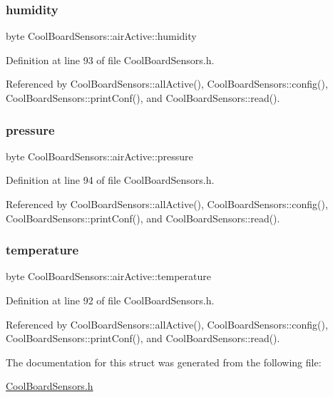 \subsubsection{\texorpdfstring{humidity}{humidity}}
{\footnotesize\ttfamily byte Cool\+Board\+Sensors\+::air\+Active\+::humidity}



Definition at line 93 of file Cool\+Board\+Sensors.\+h.



Referenced by Cool\+Board\+Sensors\+::all\+Active(), Cool\+Board\+Sensors\+::config(), Cool\+Board\+Sensors\+::print\+Conf(), and Cool\+Board\+Sensors\+::read().

\mbox{\label{structCoolBoardSensors_1_1airActive_ab200826a70d1dc9945f5efb6b9c732ed}} 
\subsubsection{\texorpdfstring{pressure}{pressure}}
{\footnotesize\ttfamily byte Cool\+Board\+Sensors\+::air\+Active\+::pressure}



Definition at line 94 of file Cool\+Board\+Sensors.\+h.



Referenced by Cool\+Board\+Sensors\+::all\+Active(), Cool\+Board\+Sensors\+::config(), Cool\+Board\+Sensors\+::print\+Conf(), and Cool\+Board\+Sensors\+::read().

\mbox{\label{structCoolBoardSensors_1_1airActive_a9a6633c426b0508e30ebc1832ec6d745}} 
\subsubsection{\texorpdfstring{temperature}{temperature}}
{\footnotesize\ttfamily byte Cool\+Board\+Sensors\+::air\+Active\+::temperature}



Definition at line 92 of file Cool\+Board\+Sensors.\+h.



Referenced by Cool\+Board\+Sensors\+::all\+Active(), Cool\+Board\+Sensors\+::config(), Cool\+Board\+Sensors\+::print\+Conf(), and Cool\+Board\+Sensors\+::read().



The documentation for this struct was generated from the following file\+:\begin{DoxyCompactItemize}
\item 
\hyperlink{CoolBoardSensors_8h}{Cool\+Board\+Sensors.\+h}\end{DoxyCompactItemize}
